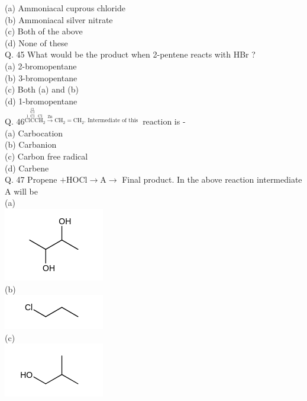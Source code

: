 \documentclass[10pt]{article}
\begin{document}
(a) Ammoniacal cuprous chloride\\
(b) Ammoniacal silver nitrate\\
(c) Both of the above\\
(d) None of these\\
Q. 45 What would be the product when 2-pentene reacts with HBr ?\\
(a) 2-bromopentane\\
(b) 3-bromopentane\\
(c) Both (a) and (b)\\
(d) 1-bromopentane\\
Q. $46 \stackrel{\stackrel{1}{\mathrm{Cl}} \stackrel{\stackrel{\mathrm{Cl}}{\mathrm{Cl}}}{\stackrel{\mathrm{Cl}}{\mathrm{C}}} \stackrel{\mathrm{Cl}}{\mathrm{CH}_{2}} \xrightarrow{\mathrm{Zn}} \mathrm{CH}_{2}=\mathrm{CH}_{2} \text {. Intermediate of this }}{ }$ reaction is -\\
(a) Carbocation\\
(b) Carbanion\\
(c) Carbon free radical\\
(d) Carbene\\
Q. 47 Propene $+\mathrm{HOCl} \rightarrow \mathrm{A} \rightarrow$ Final product. In the above reaction intermediate A will be\\
(a)\\
\includegraphics{smile-67ce68ebfeb55c837cb2cea1039d504f92d8c231}\\
(b)\\
\includegraphics{smile-f5b94e526dd444816017afa15400da5ba1885f0c}\\
(c)\\
\includegraphics{smile-14321e84ae0b58cb63c787e5ef9014125d02b195}\\
\end{document}

